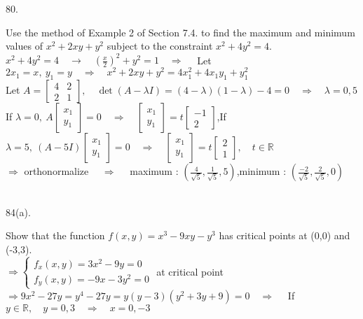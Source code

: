 \documentclass[12pt]{book}
\begin{document}
\begin{CJK}{UTF8}{bsmi}
80. \begin{minipage}[t]{\dimexpr\linewidth-2em}
Use the method of Example 2 of Section 7.4. to find the maximum and minimum values of $x^2+2xy+y^2$ subject to the constraint $x^2+4y^2=4$. \\
$\displaystyle x^2+4y^2=4\quad\rightarrow\quad\left(\frac{x}{2}\right)^2+y^2=1\quad\Rightarrow\quad$ Let $\displaystyle 2x_1=x,\ y_1=y\quad\Rightarrow\quad x^2+2xy+y^2=4x_1^2+4x_1y_1+y_1^2$ \\
Let $A=\begin{bmatrix}
4 & 2 \\
2 & 1 
\end{bmatrix},\quad\det(A-\lambda I)=(4-\lambda)(1-\lambda)-4=0\quad\Rightarrow\quad\lambda=0, 5$ \\
If $\lambda=0,\ A\begin{bmatrix}
x_1 \\ y_1
\end{bmatrix}=0\quad\Rightarrow\quad\begin{bmatrix}
x_1 \\ y_1
\end{bmatrix}=t\begin{bmatrix}
-1 \\ 2
\end{bmatrix}$,\quad If $\lambda=5,\ (A-5I)\begin{bmatrix}
x_1 \\ y_1
\end{bmatrix}=0\quad\Rightarrow\quad\begin{bmatrix}
x_1 \\ y_1
\end{bmatrix}=t\begin{bmatrix}
2 \\ 1
\end{bmatrix},\quad t\in\mathbb{R}$ \\
$\Rightarrow$ orthonormalize $\quad\Rightarrow\quad$ maximum : $\displaystyle\left(\frac{4}{\sqrt{5}}, \frac{1}{\sqrt{5}}, 5\right)$,\quad minimum : $\displaystyle\left(\frac{-2}{\sqrt{5}}, \frac{2}{\sqrt{5}}, 0\right)$
\end{minipage}\\

84(a). \begin{minipage}[t]{\dimexpr\linewidth-2em}
Show that the function $f(x, y)=x^3-9xy-y^3$ has critical points at (0,0) and (-3,3). \\
$\Rightarrow\left\{\begin{matrix}
f_x(x, y) = 3x^2-9y = 0 \\
f_y(x, y) = -9x-3y^2= 0
\end{matrix}\right.$ at critical point \\ $\displaystyle\Rightarrow 9x^2-27y=y^4-27y=y(y-3)(y^2+3y+9)=0\quad\Rightarrow\quad$ If $y\in\mathbb{R},\quad y=0, 3\quad\Rightarrow\quad x=0, -3$
\end{minipage}\\


\end{CJK}
\end{document}
